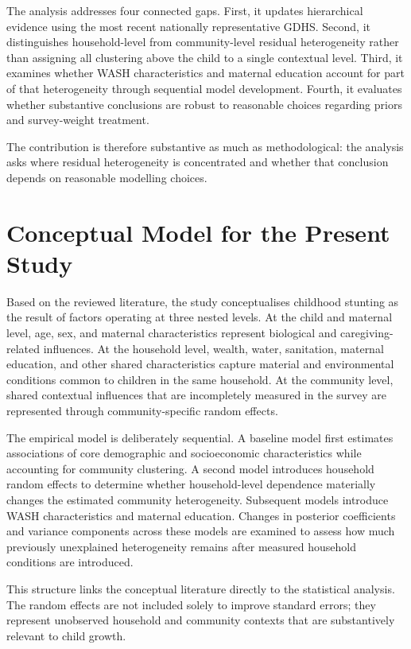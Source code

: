 The analysis addresses four connected gaps. First, it updates hierarchical evidence using the most recent nationally representative GDHS. Second, it distinguishes household-level from community-level residual heterogeneity rather than assigning all clustering above the child to a single contextual level. Third, it examines whether WASH characteristics and maternal education account for part of that heterogeneity through sequential model development. Fourth, it evaluates whether substantive conclusions are robust to reasonable choices regarding priors and survey-weight treatment.

The contribution is therefore substantive as much as methodological: the analysis asks where residual heterogeneity is concentrated and whether that conclusion depends on reasonable modelling choices.

\section{Conceptual Model for the Present Study}

Based on the reviewed literature, the study conceptualises childhood stunting as the result of factors operating at three nested levels. At the child and maternal level, age, sex, and maternal characteristics represent biological and caregiving-related influences. At the household level, wealth, water, sanitation, maternal education, and other shared characteristics capture material and environmental conditions common to children in the same household. At the community level, shared contextual influences that are incompletely measured in the survey are represented through community-specific random effects.

The empirical model is deliberately sequential. A baseline model first estimates associations of core demographic and socioeconomic characteristics while accounting for community clustering. A second model introduces household random effects to determine whether household-level dependence materially changes the estimated community heterogeneity. Subsequent models introduce WASH characteristics and maternal education. Changes in posterior coefficients and variance components across these models are examined to assess how much previously unexplained heterogeneity remains after measured household conditions are introduced.

This structure links the conceptual literature directly to the statistical analysis. The random effects are not included solely to improve standard errors; they represent unobserved household and community contexts that are substantively relevant to child growth.


